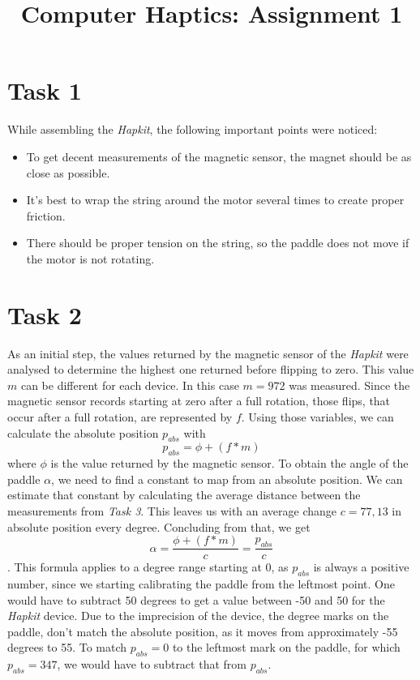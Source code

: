 



  \title{Computer Haptics: Assignment 1}
  \maketitle

  \section*{Task 1}

  While assembling the \textit{Hapkit}, the following important points were noticed:
  \begin{itemize}
    \item To get decent measurements of the magnetic sensor, the magnet should be as close as possible.
    \item It's best to wrap the string around the motor several times to create proper friction.
    \item There should be proper tension on the string, so the paddle does not move if the motor is not rotating.
  \end{itemize}

  \section*{Task 2}

  As an initial step, the values returned by the magnetic sensor of the \textit{Hapkit} were analysed to determine the highest one returned before flipping to zero. This value $m$ can be different for each device. In this case $m = 972$ was measured. Since the magnetic sensor records starting at zero after a full rotation, those flips, that occur after a full rotation, are represented by $f$. Using those variables, we can calculate the absolute position $p_{abs}$ with
  \begin{equation*}
    p_{abs} = \phi + (f * m)
  \end{equation*}
  where $\phi$ is the value returned by the magnetic sensor.
  To obtain the angle of the paddle $\alpha$, we need to find a constant to map from an absolute position. We can estimate that constant by calculating the average distance between the measurements from \textit{Task 3}. This leaves us with an average change $c = 77,13$ in absolute position every degree. Concluding from that, we get
  \begin{equation*}
    \alpha = \frac{\phi + (f * m)}{c} = \frac{p_{abs}}{c}
  \end{equation*}.
  This formula applies to a degree range starting at 0, as $p_{abs}$ is always a positive number, since we starting calibrating the paddle from the leftmost point. One would have to subtract 50 degrees to get a value between -50 and 50 for the \textit{Hapkit} device. Due to the imprecision of the device, the degree marks on the paddle, don't match the absolute position, as it moves from approximately -55 degrees to 55. To match $p_{abs} = 0$ to the leftmost mark on the paddle, for which $p_{abs} = 347$, we would have to subtract that from $p_{abs}$.

